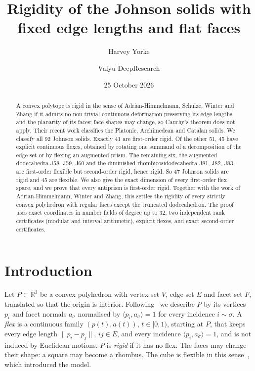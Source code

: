 \documentclass[11pt]{amsart}
\title{Rigidity of the Johnson solids with fixed edge lengths and flat faces}
\author{Harvey Yorke}
\author{Valyu DeepResearch}
\date{25 October 2026}
\theoremstyle{remark}
\newcommand{\R}{\mathbb R}
\begin{document}
\raggedbottom
\begin{abstract}
A convex polytope is rigid in the sense of Adrian-Himmelmann, Schulze, Winter and Zhang if it admits no non-trivial continuous deformation preserving its edge lengths and the planarity of its faces; face shapes may change, so Cauchy's theorem does not apply. Their recent work classifies the Platonic, Archimedean and Catalan solids. We classify all 92 Johnson solids. Exactly 41 are first-order rigid. Of the other 51, 45 have explicit continuous flexes, obtained by rotating one summand of a decomposition of the edge set or by flexing an augmented prism. The remaining six, the augmented dodecahedra J58, J59, J60 and the diminished rhombicosidodecahedra J81, J82, J83, are first-order flexible but second-order rigid, hence rigid. So 47 Johnson solids are rigid and 45 are flexible. We also give the exact dimension of every first-order flex space, and we prove that every antiprism is first-order rigid. Together with the work of Adrian-Himmelmann, Winter and Zhang, this settles the rigidity of every strictly convex polyhedron with regular faces except the truncated dodecahedron. The proof uses exact coordinates in number fields of degree up to 32, two independent rank certificates (modular and interval arithmetic), explicit flexes, and exact second-order certificates.
\end{abstract}
\maketitle

\section{Introduction}

Let $P\subset\R^3$ be a convex polyhedron with vertex set $V$, edge set $E$ and facet set $F$, translated so that the origin is interior. Following~\cite{AHWZ2026} we describe $P$ by its vertices $p_i$ and facet normals $a_\sigma$ normalised by $\langle p_i,a_\sigma\rangle=1$ for every incidence $i\sim\sigma$. A \emph{flex} is a continuous family $(p(t),a(t))$, $t\in[0,1)$, starting at $P$, that keeps every edge length $\|p_i-p_j\|$, $ij\in E$, and every incidence $\langle p_i,a_\sigma\rangle=1$, and is not induced by Euclidean motions. $P$ is \emph{rigid} if it has no flex. The faces may change their shape: a square may become a rhombus. The cube is flexible in this sense~\cite{HSW2026}, which introduced the model.
\end{document}
